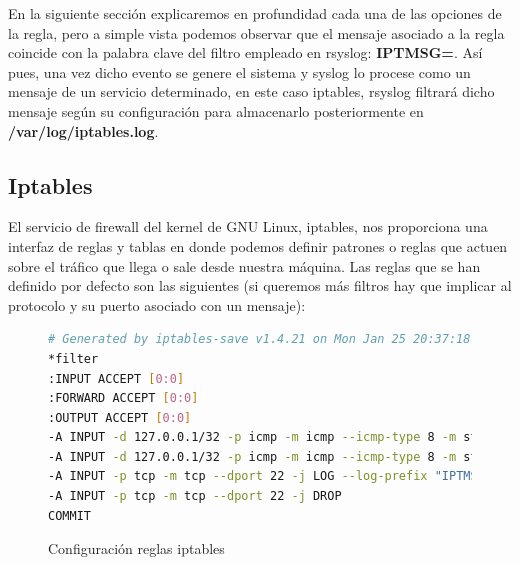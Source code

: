 \begin{minipage}{\linewidth}
En la siguiente sección explicaremos en profundidad cada una de las opciones de la regla, pero a simple vista podemos observar que el mensaje asociado a la regla coincide con la palabra clave del filtro empleado en rsyslog: \textbf{IPTMSG=}. Así pues, una vez dicho evento se genere el sistema y syslog lo procese como un mensaje de un servicio determinado, en este caso iptables, rsyslog filtrará dicho mensaje según su configuración para almacenarlo posteriormente en \textbf{/var/log/iptables.log}.
\end{minipage}
\subsection{Iptables}

El servicio de firewall del kernel de GNU Linux, iptables, nos proporciona una interfaz de reglas y tablas en donde podemos definir patrones o reglas que actuen sobre el tráfico que llega o sale desde nuestra máquina. Las reglas que se han definido por defecto son las siguientes (si queremos más filtros hay que implicar al protocolo y su puerto asociado con un mensaje):

\begin{figure}[H]
\begin{lstlisting}[language=bash]
# Generated by iptables-save v1.4.21 on Mon Jan 25 20:37:18 2016
*filter
:INPUT ACCEPT [0:0]
:FORWARD ACCEPT [0:0]
:OUTPUT ACCEPT [0:0]
-A INPUT -d 127.0.0.1/32 -p icmp -m icmp --icmp-type 8 -m state --state NEW,RELATED,ESTABLISHED -j LOG --log-prefix "IPTMSG=Connection ICMP "
-A INPUT -d 127.0.0.1/32 -p icmp -m icmp --icmp-type 8 -m state --state NEW,RELATED,ESTABLISHED -j DROP
-A INPUT -p tcp -m tcp --dport 22 -j LOG --log-prefix "IPTMSG=Connection SSH "
-A INPUT -p tcp -m tcp --dport 22 -j DROP
COMMIT
\end{lstlisting}
\caption{Configuración reglas iptables}
\end{figure}

